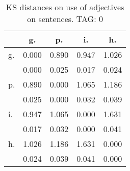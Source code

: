 \begin{table}[h!]
\begin{center}
\begin{tabular}{| l | c | c | c | c |}\hline
 & g. & p. & i. & h. \\\hline
g. & 0.000  & 0.890  & 0.947  & 1.026 \\\hline
 & 0.000  & 0.025  & 0.017  & 0.024 \\\hline
p. & 0.890  & 0.000  & 1.065  & 1.186 \\\hline
 & 0.025  & 0.000  & 0.032  & 0.039 \\\hline
i. & 0.947  & 1.065  & 0.000  & 1.631 \\\hline
 & 0.017  & 0.032  & 0.000  & 0.041 \\\hline
h. & 1.026  & 1.186  & 1.631  & 0.000 \\\hline
 & 0.024  & 0.039  & 0.041  & 0.000 \\\hline
\end{tabular}
\caption{KS distances on use of adjectives on sentences. TAG: 0}
\end{center}
\end{table}